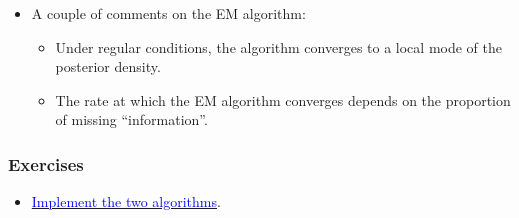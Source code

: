 \documentclass[10pt]{beamer}
\begin{document}
\begin{frame}
\begin{itemize}
\item A couple of comments on the EM algorithm: 
\smallskip
\begin{itemize}
\item Under regular conditions, the algorithm converges to a local mode of the posterior density. 
\smallskip
\item The rate at which the EM algorithm converges depends on the proportion of missing ``information''. 
\end{itemize}

\end{itemize}
\end{frame}
\begin{frame}
\frametitle{Exercises}

\begin{itemize}

\item \href{http://www.utstat.toronto.edu/sun/statgene-exercise/statgene-exercise-ABO-algorithms.pdf}{\textcolor{blue}{Implement the two algorithms}}.

\end{itemize}
\end{frame}
\begin{frame}[allowframebreaks]
\frametitle{}

\end{frame}

\end{document}
